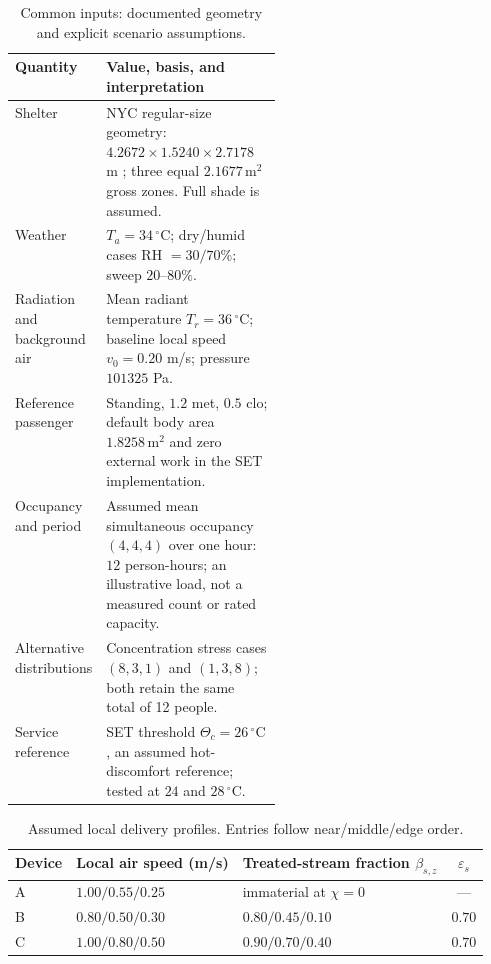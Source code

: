 \documentclass[12pt]{article}
\begin{document}
\begin{table}[!ht]
\centering\small
\caption{Common inputs: documented geometry and explicit scenario assumptions.}
\label{tab:bus-assumptions}
\renewcommand{\arraystretch}{1.12}
\begin{tabularx}{\linewidth}{@{}p{0.31\linewidth}X@{}}
\toprule
Quantity & Value, basis, and interpretation\\
\midrule
Shelter & NYC regular-size geometry: $4.2672\times1.5240\times2.7178$ m \cite{nycshelter}; three equal $2.1677\,\mathrm{m^2}$ gross zones. Full shade is assumed.\\
Weather & $T_a=34\,^{\circ}\mathrm C$; dry/humid cases RH $=30/70\%$; sweep $20$--$80\%$.\\
Radiation and background air & Mean radiant temperature $T_r=36\,^{\circ}\mathrm C$; baseline local speed $v_0=0.20$ m/s; pressure $101325$ Pa.\\
Reference passenger & Standing, $1.2$ met, $0.5$ clo; default body area $1.8258\,\mathrm{m^2}$ and zero external work in the SET implementation.\\
Occupancy and period & Assumed mean simultaneous occupancy $(4,4,4)$ over one hour: $12$ person-hours; an illustrative load, not a measured count or rated capacity.\\
Alternative distributions & Concentration stress cases $(8,3,1)$ and $(1,3,8)$; both retain the same total of 12 people.\\
Service reference & SET threshold $\Theta_c=26\,^{\circ}\mathrm C$, an assumed hot-discomfort reference; tested at $24$ and $28\,^{\circ}\mathrm C$.\\
\bottomrule
\end{tabularx}
\end{table}

\begin{table}[!ht]
\centering\small
\caption{Assumed local delivery profiles. Entries follow near/middle/edge order.}
\label{tab:bus-fields}
\begin{tabularx}{\linewidth}{@{}lXXc@{}}
\toprule
Device & Local air speed (m/s) & Treated-stream fraction $\beta_{s,z}$ & $\varepsilon_s$\\
\midrule
A & $1.00 / 0.55 / 0.25$ & immaterial at $\chi=0$ & ---\\
B & $0.80 / 0.50 / 0.30$ & $0.80 / 0.45 / 0.10$ & $0.70$\\
C & $1.00 / 0.80 / 0.50$ & $0.90 / 0.70 / 0.40$ & $0.70$\\
\bottomrule
\end{tabularx}
\end{table}
\end{document}
